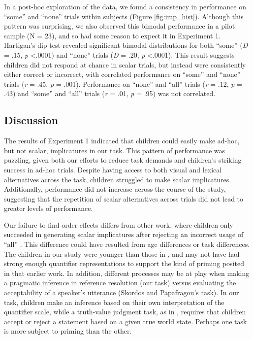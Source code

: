 \documentclass[man]{apa2}
\begin{document}
In a post-hoc exploration of the data, we found a consistency in performance on ``some'' and ``none'' trials within subjects (Figure \ref{fig:imp_hist}). Although this pattern was surprising, we also observed this bimodal performance in a pilot sample (N = 23), and so had some reason to expect it in Experiment 1. Hartigan's dip test revealed significant bimodal distributions for both ``some'' (\textit{D} = .15, \textit{p} \textless  .0001) and ``none'' trials (\textit{D} = .20, \textit{p} \textless  .0001). This result suggests children did not respond at chance in scalar trials, but instead were consistently either correct or incorrect, with correlated performance on ``some'' and ``none'' trials (\textit{r} = .45, \textit{p} =  .001). Performance on ``none'' and ``all'' trials (\textit{r} = .12, \textit{p} = .43) and ``some'' and ``all'' trials (\textit{r} = .01, \textit{p} = .95) was not correlated.

\subsection{Discussion}

The results of Experiment 1 indicated that children could easily make ad-hoc, but not scalar, implicatures in our task. This pattern of performance was puzzling, given both our efforts to reduce task demands and children's striking success in ad-hoc trials. Despite having access to both visual and lexical alternatives across the task, children struggled to make scalar implicatures. Additionally, performance did not increase across the course of the study, suggesting that the repetition of scalar alternatives across trials did not lead to greater levels of performance.

Our failure to find order effects differs from other work, where children only succeeded in generating scalar implicatures after rejecting an incorrect usage of ``all'' \cite{skordos2016}. This difference could have resulted from age differences or task differences. The children in our study were younger than those in , and may not have had strong enough quantifier representations to support the kind of priming posited in that earlier work. In addition, different processes may be at play when making a pragmatic inference in reference resolution (our task) versus evaluating the acceptability of a speaker's utterance (Skordos and Papafragou's task). In our task, children make an inference based on their own interpretation of the quantifier scale, while a truth-value judgment task, as in , requires that children accept or reject a statement based on a given true world state. Perhaps one task is more subject to priming than the other.
\end{document}
